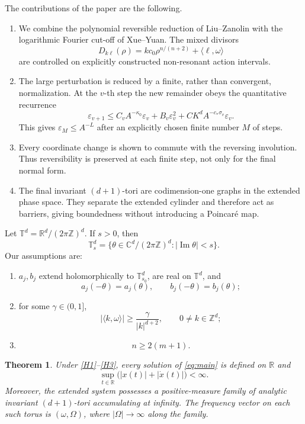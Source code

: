 \documentclass[11pt]{amsart}
\newtheorem{theorem}{Theorem}[section]
\theoremstyle{remark}
\newcommand{\T}{\mathbb T}
\newcommand{\R}{\mathbb R}
\newcommand{\Z}{\mathbb Z}
\newcommand{\eps}{\varepsilon}
\begin{document}
The contributions of the paper are the following.
\begin{enumerate}[label=\textup{(\roman*)}]
\item We combine the polynomial reversible reduction of
Liu--Zanolin with the logarithmic Fourier cut-off of Xue--Yuan.  The mixed
divisors
\[
 D_{k\ell}(\rho)=k c_0\rho^{n/(n+2)}
                 +\langle\ell,\omega\rangle
\]
are controlled on explicitly constructed non-resonant action intervals.
\item The large perturbation is reduced by a finite, rather than
convergent, normalization.  At the $v$-th step the new remainder obeys the
quantitative recurrence
\[
 \eps_{v+1}\leq C_vA^{-\kappa_0}\eps_v+
 B_v\eps_v^2+CK^dA^{-c_*\sigma_v}\eps_v.
\]
This gives $\eps_M\leq A^{-L}$ after an explicitly chosen finite number
$M$ of steps.
\item Every coordinate change is shown to commute with the reversing
involution.  Thus reversibility is preserved at each finite step, not only
for the final normal form.
\item The final invariant $(d+1)$-tori are codimension-one graphs in the
extended phase space.  They separate the extended cylinder and therefore
act as barriers, giving boundedness without introducing a Poincar\'e map.
\end{enumerate}

Let $\T^d=\R^d/(2\pi\Z)^d$.  If $s>0$, then
\[
 \T_s^d=\{\theta\in\mathbb C^d/(2\pi\Z)^d:
               |\operatorname{Im}\theta|<s\}.
\]
Our assumptions are:
\begin{enumerate}[label=\textup{(H\arabic*)}]
\item\label{H1}
$a_j,b_j$ extend holomorphically to $\T_{s_0}^d$, are real on $\T^d$, and
\[
 a_j(-\theta)=a_j(\theta),\qquad b_j(-\theta)=b_j(\theta);
\]
\item\label{H2}
for some $\gamma\in(0,1]$,
\begin{equation}\label{eq:DC}
 |\langle k,\omega\rangle|
 \geq\frac{\gamma}{|k|^{d+2}},
 \qquad 0\neq k\in\Z^d;
\end{equation}
\item\label{H3}
\begin{equation}\label{eq:degree}
 n\geq2(m+1).
\end{equation}
\end{enumerate}

\begin{theorem}\label{thm:main}
Under \ref{H1}--\ref{H3}, every solution of \eqref{eq:main} is defined on
$\R$ and
\[
 \sup_{t\in\R}\bigl(|x(t)|+|\dot x(t)|\bigr)<\infty.
\]
Moreover, the extended system possesses a positive-measure family of
analytic invariant $(d+1)$-tori accumulating at infinity.  The frequency
vector on each such torus is $(\omega,\Omega)$, where
$|\Omega|\to\infty$ along the family.
\end{theorem}
\end{document}
